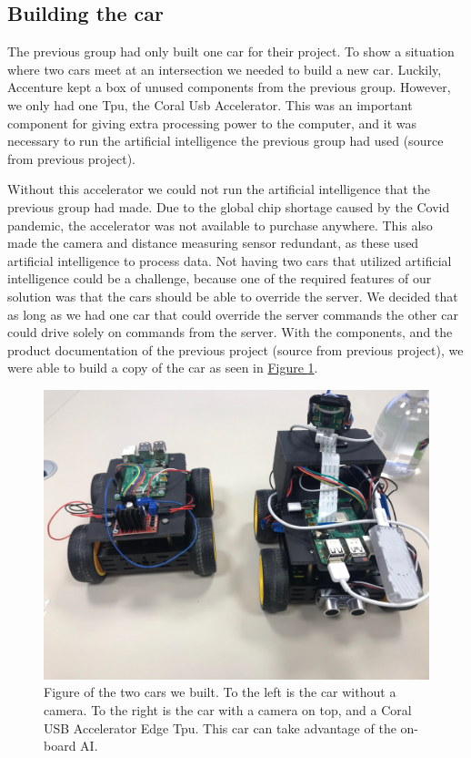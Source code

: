 \subsection{Building the car}
The previous group had only built one car for their project. To show a situation where two cars meet at an intersection we needed to build a new car. Luckily, Accenture kept a box of unused components from the previous group. However, we only had one Tpu, the Coral Usb Accelerator. This was an important component for giving extra processing power to the computer, and it was necessary to run the artificial intelligence the previous group had used (source from previous project). 

Without this accelerator we could not run the artificial intelligence that the previous group had made. Due to the global chip shortage caused by the Covid pandemic, the accelerator was not available to purchase anywhere. This also made the camera and distance measuring sensor redundant, as these used artificial intelligence to process data. Not having two cars that utilized artificial intelligence could be a challenge, because one of the required features of our solution was that the cars should be able to override the server. We decided that as long as we had one car that could override the server commands the other car could drive solely on commands from the server. With the components, and the product documentation of the previous project (source from previous project), we were able to build a copy of the car as seen in \hyperref[fig:twocars]{Figure \ref{fig:twocars}}.

\begin{figure}[h!]
	\centering
	\includegraphics[width=0.9\linewidth]{figures/two_cars}
	\caption[scrum process]{Figure of the two cars we built. To the left is the car without a camera. To the right is the car with a camera on top, and a Coral USB Accelerator Edge Tpu. This car can take advantage of the on-board AI.}
	\label{fig:twocars}
\end{figure}



